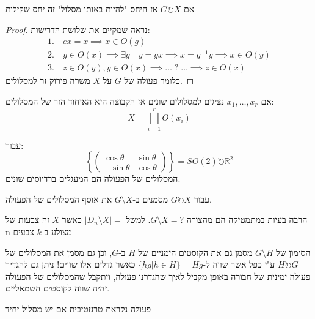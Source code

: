 \documentclass{tstextbook}
\begin{document}
\begin{proposition}
אם \(G\circlearrowright X\) אז היחס "להיות באותו מסלול" זה יחס שקילות

\end{proposition}
\begin{proof}
נראה שמקיים את שלושת הדרישות:
\begin{gather*}1.\quad  ex=x \implies x \in O(g) \\2.\quad  y\in O(x)\implies \exists g\quad y=gx\implies x=g^{-1}y\implies x \in O(y) \\3.\quad z\in O(y),y\in O(x)\implies \dots \;?\;\dots\implies z\in O(x)
\end{gather*}
כלומר פעולה של \(G\) על \(X\) משרה פירוק זר למסלולים.

\end{proof}
\begin{corollary}
אם \(x_{1},\dots,x_{r}\) נציגים למסלולים שונים אז הקבוצה היא האיחוד הזר של המסלולים:
$$X=\bigsqcup_{i=1}^r O(x_{i})$$

\end{corollary}
\begin{example}
עבור:
$$\left\{ \begin{pmatrix}\cos \theta & \sin \theta \\-\sin \theta  & \cos \theta
\end{pmatrix} \right\}=SO(2)\circlearrowright\mathbb{R}^2$$
המסלולים של הפעולה הם המעגלים ברדיוסים שונים. 

\end{example}
\begin{symbolize}
עבור \(G\circlearrowright X\) מסמנים ב-\(G\setminus X\) את אוסף המסלולים של הפעולה.

\end{symbolize}
\begin{remark}
הרבה בעיות במתמטיקה הם מהצורה \(G\setminus X=?\). למשל \(|D_{n}\setminus X |=\) כאשר \(X\) זה צבעות של n-מצולע ב-\(k\) צבעים

\end{remark}
\begin{remark}
הסימון של \(G\setminus H\) מסמן גם את הקוסטים הימניים של \(H\) ב-\(G\), וכן גם מסמן את המסלולים של \(H\circlearrowright G\) ע"י כפל אשר שווה ל-\(\{ hg|h\in H \}=Hg\) כאשר גדלים אלו שווים!
ניתן גם להגדיר פעולה ימינית של חבורה באופן מקביל לאיך שהגדרנו פעולה, ויתקבל שהמסלולים של הפעולה יהיה שווה לקוסטים השמאליים.

\end{remark}
\begin{definition}
פעולה נקראת טרנזטיבית אם יש מסלול יחיד

\end{definition}
\end{document}
